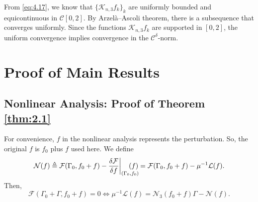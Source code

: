 \documentclass[11pt]{article}
\makeatletter
\renewenvironment{proof}[1][\proofname]{\par
  \vspace{-.7\topsep}%
  \pushQED{\qed}%
  \normalfont
  \topsep0pt \partopsep0pt %
  \trivlist
  \item[\hskip\labelsep
        \itshape
    #1\@addpunct{.}]\ignorespaces
}{%
  \popQED\endtrivlist\@endpefalse
  \addvspace{6pt plus 6pt} %
}
\theoremstyle{definition}
\theoremstyle{remark}
\numberwithin{equation}{section}
\newcommand{\mcal}{\mathcal}
\makeatother
\begin{document}
\begin{proof}
From \eqref{eq:4.17}, we know that $\{\mcal{K}_{n,3} f_k\}_k$ are uniformly bounded and equicontinuous in $\mcal{C}[0,2]$. By Arzelà–Ascoli theorem, there is a subsequence that converges uniformly. Since the functions $\mcal{K}_{n,3} f_k$ are supported in $[0,2]$, the uniform convergence implies convergence in the $\mcal{C}^\delta$-norm.
\end{proof}

\section{Proof of Main Results}
\subsection{Nonlinear Analysis: Proof of Theorem \ref{thm:2.1}} \label{subsec:5.1}
For convenience, $f$ in the nonlinear analysis represents the perturbation. So, the original $f$ is $f_0$ plus $f$ used here. We define
\[\mcal{N}(f) \triangleq \mcal{F}(\Gamma_0, f_0 + f) - \frac{\delta \mcal{F}}{\delta f}\bigg\vert_{(\Gamma_0, f_0)} \hspace{-1.5em} (f) = \mcal{F}(\Gamma_0, f_0 + f) - \mu^{-1} \mcal{L}(f).\]
Then,
\begin{equation} \label{eq:5.1}
\mcal{F}(\Gamma_0 + \Gamma, f_0 + f) = 0 \iff \mu^{-1} \mcal{L}(f) = \mcal{N}_3(f_0 + f) \Gamma - \mcal{N}(f).
\end{equation}
\end{document}
